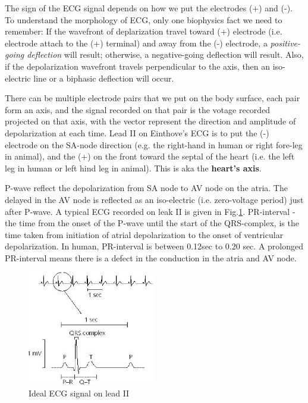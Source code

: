 The sign of the ECG signal depends on how we put the electrodes (+) and (-). To
understand the morphology of ECG, only one biophysics fact we need to remember:
If the wavefront of deplarization travel toward (+) electrode (i.e. electrode
attach to the (+) terminal) and away from the (-) electrode, a {\it
positive-going deflection} will result; otherwise, a negative-going deflection
will result. Also, if the depolarization wavefront travels perpendicular to the
axis, then an iso-electric line or a biphasic deflection will occur.

There can be multiple electrode pairs that we put on the body surface, each pair
form an axis, and the signal recorded on that pair is the votage recorded
projected on that axis, with the vector represent the direction and amplitude of
depolarization at each time.
Lead II on Einthove's ECG is to put the (-) electrode on the SA-node direction
(e.g. the right-hand in human or right fore-leg in animal), and the (+) on the
front toward the septal of the heart (i.e. the left leg in human or left hind
leg in animal). This is aka the {\bf heart's axis}.


P-wave reflect the depolarization from SA node to AV node on the atria. The
delayed in the AV node is reflected as an iso-electric (i.e. zero-voltage
period) just after P-wave. A typical ECG recorded on leak II is given in
Fig.\ref{fig:ECG_ideal}. PR-interval - the time from the onset of the P-wave
until the start of the QRS-complex, is the time taken from initiation of atrial
depolarization to the onset of ventricular depolarization. In human, PR-interval
is between 0.12sec to 0.20 sec. A prolonged PR-interval means there is a defect
in the conduction in the atria and AV node.

\begin{figure}[hbt]
  \centerline{\includegraphics[height=5cm,
    angle=0]{./images/ECG_ideal.eps}}
  \caption{Ideal ECG signal on lead II}
  \label{fig:ECG_ideal}
\end{figure}

